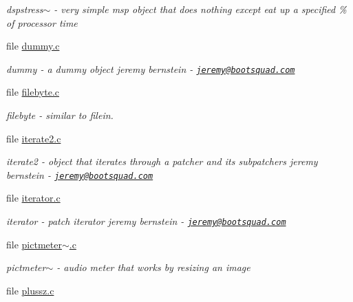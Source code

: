 \begin{DoxyCompactItemize}
\begin{DoxyCompactList}\small\item\em dspstress$\sim$ -\/ very simple msp object that does nothing except eat up a specified \% of processor time \item\end{DoxyCompactList}\item 
file \hyperlink{dummy_8c}{dummy.c}


\begin{DoxyCompactList}\small\item\em dummy -\/ a dummy object jeremy bernstein -\/ \href{mailto:jeremy@bootsquad.com}{\tt jeremy@bootsquad.com} \item\end{DoxyCompactList}\item 
file \hyperlink{filebyte_8c}{filebyte.c}


\begin{DoxyCompactList}\small\item\em filebyte -\/ similar to filein. \item\end{DoxyCompactList}\item 
file \hyperlink{iterate2_8c}{iterate2.c}


\begin{DoxyCompactList}\small\item\em iterate2 -\/ object that iterates through a patcher and its subpatchers jeremy bernstein -\/ \href{mailto:jeremy@bootsquad.com}{\tt jeremy@bootsquad.com} \item\end{DoxyCompactList}\item 
file \hyperlink{iterator_8c}{iterator.c}


\begin{DoxyCompactList}\small\item\em iterator -\/ patch iterator jeremy bernstein -\/ \href{mailto:jeremy@bootsquad.com}{\tt jeremy@bootsquad.com} \item\end{DoxyCompactList}\item 
file \hyperlink{pictmeter~_8c}{pictmeter$\sim$.c}


\begin{DoxyCompactList}\small\item\em pictmeter$\sim$ -\/ audio meter that works by resizing an image \item\end{DoxyCompactList}\item 
file \hyperlink{plussz_8c}{plussz.c}



\end{DoxyCompactItemize}
